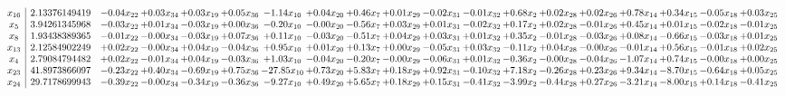 \documentclass[9pt]{article}
\begin{document}
 \[\begin{array}{c| c c@{\hskip 2pt} c@{\hskip 2pt} c@{\hskip 2pt} c@{\hskip 2pt} c@{\hskip 2pt} c@{\hskip 2pt} c@{\hskip 2pt} c@{\hskip 2pt} c@{\hskip 2pt} c@{\hskip 2pt} c@{\hskip 2pt} c@{\hskip 2pt} c@{\hskip 2pt} c@{\hskip 2pt} c@{\hskip 2pt} c@{\hskip 2pt} c@{\hskip 2pt} }
 x_{16}   &  2.13376149419 & -0.04 x_{22} & +  0.03 x_{34} & +  0.03 x_{19} & +  0.05 x_{36} & -1.14 x_{10} & +  0.04 x_{20} & +  0.46 x_{7} & +  0.01 x_{29} & -0.02 x_{31} & -0.01 x_{32} & +  0.68 x_{2} & +  0.02 x_{28} & +  0.02 x_{26} & +  0.78 x_{14} & +  0.34 x_{15} & -0.05 x_{18} & +  0.03 x_{25}\\
 x_{5}   &  3.94261345968 & -0.03 x_{22} & +  0.01 x_{34} & -0.03 x_{19} & +  0.00 x_{36} & -0.20 x_{10} & -0.00 x_{20} & -0.56 x_{7} & +  0.03 x_{29} & +  0.01 x_{31} & -0.02 x_{32} & +  0.17 x_{2} & +  0.02 x_{28} & -0.01 x_{26} & +  0.45 x_{14} & +  0.01 x_{15} & -0.02 x_{18} & -0.01 x_{25}\\
 x_{8}   &  1.93438389365 & -0.01 x_{22} & -0.00 x_{34} & -0.03 x_{19} & +  0.07 x_{36} & +  0.11 x_{10} & -0.03 x_{20} & -0.51 x_{7} & +  0.04 x_{29} & +  0.03 x_{31} & +  0.01 x_{32} & +  0.35 x_{2} & -0.01 x_{28} & -0.03 x_{26} & +  0.08 x_{14} & -0.66 x_{15} & -0.03 x_{18} & +  0.01 x_{25}\\
 x_{13}   &  2.12584902249 & +  0.02 x_{22} & -0.00 x_{34} & +  0.04 x_{19} & -0.04 x_{36} & +  0.95 x_{10} & +  0.01 x_{20} & +  0.13 x_{7} & +  0.00 x_{29} & -0.05 x_{31} & +  0.03 x_{32} & -0.11 x_{2} & +  0.04 x_{28} & -0.00 x_{26} & -0.01 x_{14} & +  0.56 x_{15} & -0.01 x_{18} & +  0.02 x_{25}\\
 x_{4}   &  2.79084794482 & +  0.02 x_{22} & -0.01 x_{34} & +  0.04 x_{19} & -0.03 x_{36} & +  1.03 x_{10} & -0.04 x_{20} & -0.20 x_{7} & -0.00 x_{29} & -0.06 x_{31} & +  0.01 x_{32} & -0.36 x_{2} & -0.00 x_{28} & -0.04 x_{26} & -1.07 x_{14} & +  0.74 x_{15} & -0.00 x_{18} & +  0.00 x_{25}\\
 x_{23}   &  41.8973866097 & -0.23 x_{22} & +  0.40 x_{34} & -0.69 x_{19} & +  0.75 x_{36} & -27.85 x_{10} & +  0.73 x_{20} & +  5.83 x_{7} & +  0.18 x_{29} & +  0.92 x_{31} & -0.10 x_{32} & +  7.18 x_{2} & -0.26 x_{28} & +  0.23 x_{26} & +  9.34 x_{14} & -8.70 x_{15} & -0.64 x_{18} & +  0.05 x_{25}\\
 x_{24}   &  29.7178699943 & -0.39 x_{22} & -0.00 x_{34} & -0.34 x_{19} & -0.36 x_{36} & -9.27 x_{10} & +  0.49 x_{20} & +  5.65 x_{7} & +  0.18 x_{29} & +  0.15 x_{31} & -0.41 x_{32} & -3.99 x_{2} & -0.44 x_{28} & +  0.27 x_{26} & -3.21 x_{14} & -8.00 x_{15} & +  0.14 x_{18} & -0.41 x_{25}\\

\end{array}\]
\end{document}
